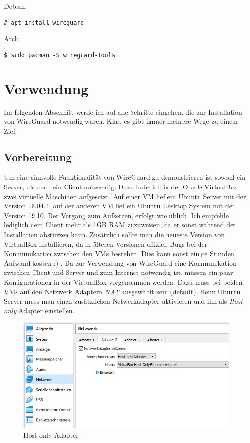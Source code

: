 \newpage  \noindent
Debian:
\begin{lstlisting}
# apt install wireguard
\end{lstlisting}
Arch:
\begin{lstlisting}
$ sudo pacman -S wireguard-tools
\end{lstlisting}

\section{Verwendung} %
Im folgenden Abschnitt werde ich auf alle Schritte eingehen, die zur Installation von WireGuard notwendig waren. Klar, es gibt immer mehrere Wege zu einem Ziel.
\subsection{Vorbereitung} 
\label{vorbereitung}
Um eine sinnvolle Funktionalität von WireGuard zu demonstrieren ist sowohl ein Server, als auch ein Client notwendig. Dazu habe ich in der Oracle VirtualBox zwei virtuelle Maschinen aufgesetzt. Auf einer VM lief ein \href{https://ubuntu.com/download/server}{Ubuntu Server} mit der Version 18.04.4, auf der anderen VM lief ein \href{https://ubuntu.com/download/desktop}{Ubuntu Desktop System} mit der Version 19.10. Der Vorgang zum Aufsetzen, erfolgt wie üblich. Ich empfehle lediglich dem Client mehr als 1GB RAM zuzuweisen, da er sonst während der Installation abstürzen kann. Zusätzlich sollte man die neueste Version von VirtualBox installieren, da in älteren Versionen offiziell Bugs bei der Kommunikation zwischen den VMs bestehen. Dies kann sonst einige Stunden Aufwand kosten :) .\newline
Da zur Verwendung von WireGuard eine Kommunikation zwischen Client und Server und zum Internet notwendig ist, müssen ein paar Konfigurationen in der VirtualBox vorgenommen werden. Dazu muss bei beiden VMs auf den Netzwerk Adaptern \textit{NAT} ausgewählt sein (default). Beim Ubuntu Server muss man einen zusätzlichen Netwerkadapter aktivieren und ihn als \textit{Host-only} Adapter einstellen. \newline
\begin{figure}[H]
  \centering
  \includegraphics[scale=0.75]{images/vm-nw.png}
  \caption{Host-only Adapter}
\end{figure} \noindent
